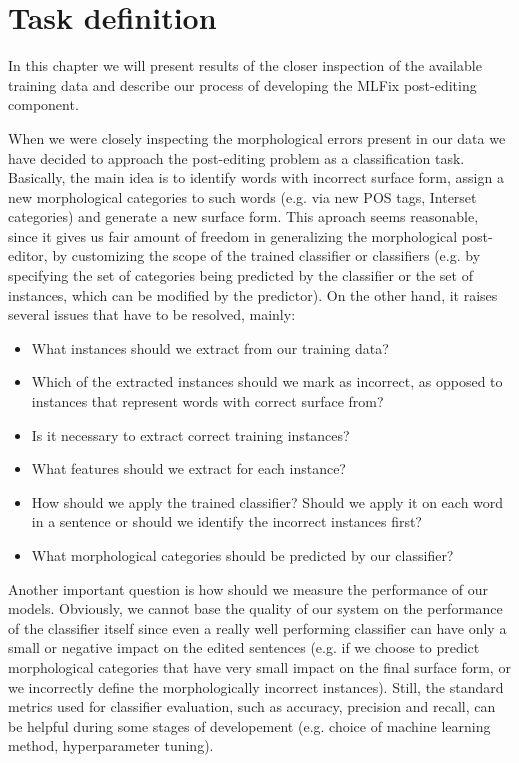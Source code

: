 \chapter{Task definition}
\label{chap:task_descr}

In this chapter we will present results of the closer inspection
of the available training data and describe our process of developing
the MLFix post-editing component.


When we were closely inspecting the morphological errors present in our data we have decided
to approach the post-editing problem as a classification task. 
Basically, the main idea is to identify words with incorrect surface form,
assign a new morphological categories to such words (e.g. via new POS tags, Interset
categories) and generate a new surface form.
This aproach seems reasonable, since it gives us fair amount of freedom in generalizing the morphological
post-editor, by customizing the scope of the trained classifier or classifiers (e.g. by specifying the
set of categories being predicted by the classifier or the set of instances, which can be modified by the predictor).
On the other hand, it raises several issues that have to be resolved, mainly:
\begin{itemize}
    \item What instances should we extract from our training data?
    \item Which of the extracted instances should we mark as incorrect, as opposed
        to instances that represent words with correct surface from?
    \item Is it necessary to extract correct training instances?
    \item What features should we extract for each instance?
    \item How should we apply the trained classifier? Should we apply it
        on each word in a sentence or should we identify the incorrect instances
        first?
    \item What morphological categories should be predicted by our classifier?
\end{itemize}

Another important question is how should we measure the performance of our models.
Obviously, we cannot base the quality of our system on the performance of the
classifier itself since even a really well performing classifier can have only a small or negative
impact on the edited sentences (e.g. if we choose to predict morphological categories
that have very small impact on the final surface form, or we incorrectly define the morphologically incorrect
instances). Still, the standard metrics
used for classifier evaluation, such as accuracy, precision and recall, can be helpful
during some stages of developement (e.g. choice of machine learning method, hyperparameter tuning).

